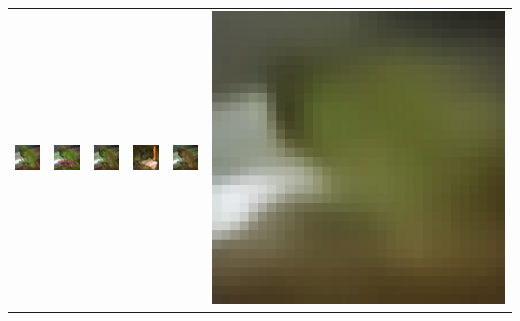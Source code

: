 \begin{table}[h!]
{\begin{tabular}{cccccc}
        \includegraphics[width=.145\textwidth]{chapter4/figures/images/cifar10/original/8.png} &   
        \includegraphics[width=.145\textwidth]{chapter4/figures/images/cifar10/reconstruction/8.png} &
        \includegraphics[width=.145\textwidth]{chapter4/figures/images/cifar10/corrected_reconstruction/8.png} &
        \includegraphics[width=.145\textwidth]{chapter4/figures/images/cifar10/diffusion_decoder_beta_0.01/8.png} &
        \includegraphics[width=.145\textwidth]{chapter4/figures/images/cifar10/diffusion_decoder_beta_0/8.png} &
        \includegraphics[width=.145\textwidth]{chapter4/figures/images/cifar10/VAE_reconstruction/8.png} \\
 

\end{tabular}}
\end{table}
